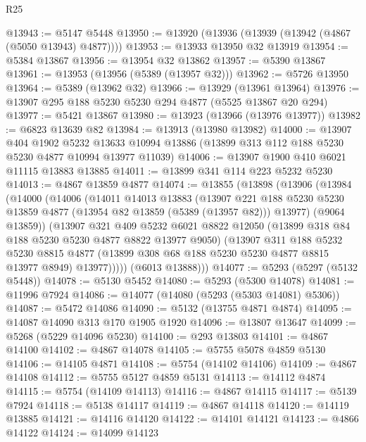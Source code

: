 \begin{lexlean}{R25}
\begin{coremodule}
@13943 := @5147 @5448
@13950 := @13920 (@13936 (@13939 (@13942 (@4867 (@5050 @13943) @4877))))
@13953 := @13933 @13950 @32 @13919
@13954 := @5384 @13867
@13956 := @13954 @32 @13862
@13957 := @5390 @13867
@13961 := @13953 (@13956 (@5389 (@13957 @32)))
@13962 := @5726 @13950
@13964 := @5389 (@13962 @32)
@13966 := @13929 (@13961 @13964)
@13976 := @13907 @295 @188 @5230 @5230 @294 @4877 (@5525 @13867 @20 @294)
@13977 := @5421 @13867
@13980 := @13923 (@13966 (@13976 @13977))
@13982 := @6823 @13639 @82
@13984 := @13913 (@13980 @13982)
@14000 := @13907
    @404
    @1902
    @5232
    @13633
    @10994
    @13886
    (@13899 @313 @112 @188 @5230 @5230 @4877 @10994 @13977 @11039)
@14006 := @13907 @1900 @410 @6021 @11115 @13883 @13885
@14011 := @13899 @341 @114 @223 @5232 @5230
@14013 := @4867 @13859 @4877
@14074 := @13855
    (@13898
      (@13906
        (@13984
          (@14000
            (@14006
              (@14011
                @14013
                @13883
                (@13907
                  @221
                  @188
                  @5230
                  @5230
                  @13859
                  @4877
                  (@13954 @82 @13859 (@5389 (@13957 @82)))
                  @13977)
                (@9064 @13859))
              (@13907
                @321
                @409
                @5232
                @6021
                @8822
                @12050
                (@13899 @318 @84 @188 @5230 @5230 @4877 @8822 @13977 @9050)
                (@13907
                  @311
                  @188
                  @5232
                  @5230
                  @8815
                  @4877
                  (@13899 @308 @68 @188 @5230 @5230 @4877 @8815 @13977 @8949)
                  @13977)))))
        (@6013 @13888)))
@14077 := @5293 (@5297 (@5132 @5448))
@14078 := @5130 @5452
@14080 := @5293 (@5300 @14078)
@14081 := @11996 @7924
@14086 := @14077 (@14080 (@5293 (@5303 @14081) @5306))
@14087 := @5472 @14086
@14090 := @5132 (@13755 @4871 @4874)
@14095 := @14087 @14090 @313 @170 @1905 @1920
@14096 := @13807 @13647
@14099 := @5268 (@5229 @14096 @5230)
@14100 := @293 @13803
@14101 := @4867 @14100
@14102 := @4867 @14078
@14105 := @5755 @5078 @4859 @5130
@14106 := @14105 @4871
@14108 := @5754 (@14102 @14106)
@14109 := @4867 @14108
@14112 := @5755 @5127 @4859 @5131
@14113 := @14112 @4874
@14115 := @5754 (@14109 @14113)
@14116 := @4867 @14115
@14117 := @5139 @7924
@14118 := @5138 @14117
@14119 := @4867 @14118
@14120 := @14119 @13885
@14121 := @14116 @14120
@14122 := @14101 @14121
@14123 := @4866 @14122
@14124 := @14099 @14123

\end{coremodule}
\end{lexlean}

